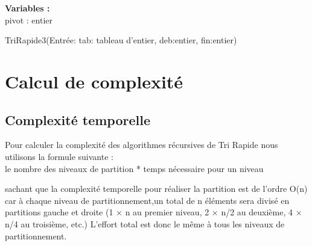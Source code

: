 \par
\begin{function}[H]
    \textbf{Variables :}\\
     pivot : entier\;
    \caption{TriRapide3(Entrée: tab: tableau d'entier, deb:entier, fin:entier)}
\end{function}
\section{Calcul de complexité}
\subsection{Complexité temporelle}
Pour calculer la complexité des algorithmes récursives de Tri Rapide nous utilisons la formule suivante : \\
le nombre des niveaux de partition * temps nécessaire pour un niveau

sachant que la complexité temporelle pour réaliser la partition  est de l'ordre O(n) car à chaque niveau de partitionnement,un total de n éléments sera divisé en partitions gauche et droite (1 × n au premier niveau, 2 × n/2 au deuxième, 4 × n/4 au troisième, etc.) L'effort total est donc le même à tous les niveaux de partitionnement.\\


